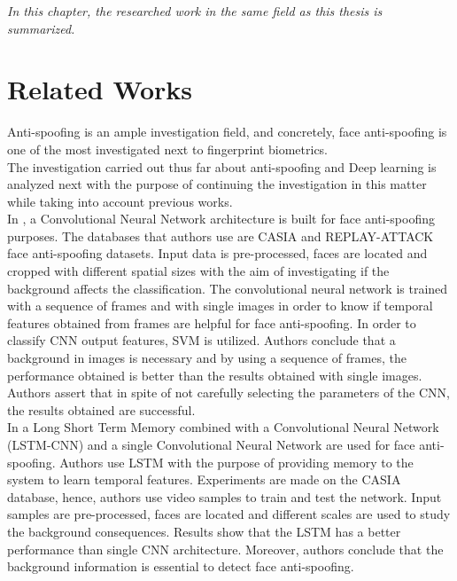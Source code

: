 
\begin{small}
\emph{In this chapter, the researched work in the same field as this thesis is summarized.}
\end{small}

\section{Related Works}
Anti-spoofing is an ample investigation field, and concretely, face anti-spoofing is one of the most investigated next to fingerprint biometrics.\\

The investigation carried out  thus far about anti-spoofing and Deep learning is analyzed next with the purpose of continuing the investigation in this matter while taking into account previous works.\\

In \cite{yangLL14}, a Convolutional Neural Network architecture is built for face anti-spoofing purposes.  The databases that authors use are CASIA and REPLAY-ATTACK face anti-spoofing datasets. Input data is pre-processed, faces are located and cropped with different spatial sizes with the aim of investigating if the background affects the classification. The convolutional neural network is trained with a sequence of frames and with single images in order to know if temporal features obtained from frames are helpful for face anti-spoofing. In order to classify CNN output features, SVM is utilized. Authors conclude that a background in images is necessary and by using a sequence of frames, the performance obtained is better than the results obtained with single images. Authors assert that in spite of not carefully selecting the parameters of the CNN, the results obtained are successful. \\

In \cite{LSTM-CNN} a Long Short Term Memory combined with a Convolutional Neural Network (LSTM-CNN) and a single Convolutional Neural Network are used for face anti-spoofing. Authors use LSTM with the purpose of providing memory to the system to learn temporal features. Experiments are made on the CASIA database, hence, authors use video samples to train and test the network. Input samples are pre-processed, faces are located and different scales are used to study the background consequences. Results show that the LSTM has a better performance than single CNN architecture. Moreover, authors conclude that the background information is essential to detect face anti-spoofing.\\

